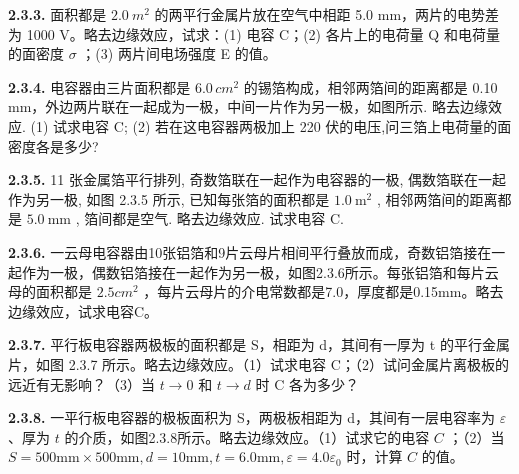 \vfill
\newpage

\textbf{2.3.3.} 面积都是 $2.0 ~m^{2}$ 的两平行金属片放在空气中相距 5.0 mm，两片的电势差为 1000 V。略去边缘效应，试求：(1) 电容 C；(2) 各片上的电荷量 Q 和电荷量的面密度 $\sigma$ ；(3) 两片间电场强度 E 的值。

\vfill
\newpage

\textbf{2.3.4.} 电容器由三片面积都是 $6.0 \, cm^{2}$ 的锡箔构成，相邻两箔间的距离都是 0.10 mm，外边两片联在一起成为一极，中间一片作为另一极，如图所示. 略去边缘效应. (1) 试求电容 C; (2) 若在这电容器两极加上 220 伏的电压,问三箔上电荷量的面密度各是多少?

\vfill
\newpage

\textbf{2.3.5.} 11 张金属箔平行排列, 奇数箔联在一起作为电容器的一极, 偶数箔联在一起作为另一极, 如图 2.3.5 所示, 已知每张箔的面积都是 $1.0 \mathrm{~m}^{2}$ , 相邻两箔间的距离都是 $5.0 \mathrm{~mm}$ , 箔间都是空气. 略去边缘效应. 试求电容 C.

\begin{center}
\end{center}

\vfill
\newpage

\textbf{2.3.6.} 一云母电容器由10张铝箔和9片云母片相间平行叠放而成，奇数铝箔接在一起作为一极，偶数铝箔接在一起作为另一极，如图2.3.6所示。每张铝箔和每片云母的面积都是 $2.5cm^{2}$ ，每片云母片的介电常数都是7.0，厚度都是0.15mm。略去边缘效应，试求电容C。

\vfill
\newpage

\textbf{2.3.7.} 平行板电容器两极板的面积都是 S，相距为 d，其间有一厚为 t 的平行金属片，如图 2.3.7 所示。略去边缘效应。（1）试求电容 C；（2）试问金属片离极板的远近有无影响？（3）当 $t \to 0$ 和 $t \to d$ 时 C 各为多少？

\begin{center}
\end{center}

\vfill
\newpage

\textbf{2.3.8.} 一平行板电容器的极板面积为 S，两极板相距为 d，其间有一层电容率为 $\varepsilon$ 、厚为 $t$ 的介质，如图2.3.8所示。略去边缘效应。（1）试求它的电容 $C$ ；（2）当 $S = 500\mathrm{mm} \times 500\mathrm{mm}, d = 10\mathrm{mm}, t = 6.0\mathrm{mm}, \varepsilon = 4.0\varepsilon_0$ 时，计算 $C$ 的值。

\begin{center}
\end{center}

